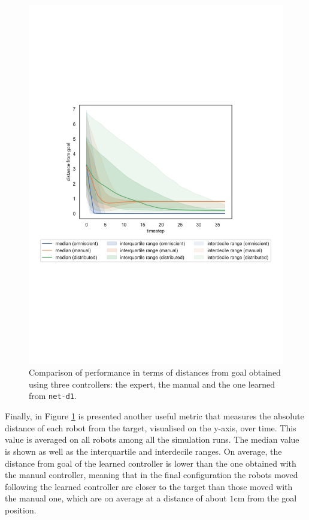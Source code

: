 \begin{figure}[H]
	\centering
	\includegraphics[width=.65\textwidth]{contents/images/net-d1/distances-from-goal-compressed-distributed}%
	\caption[Evaluation of \texttt{net-d1} distances from goal.]{Comparison of 
		performance in terms of distances from goal obtained using three 
		controllers: 
		the expert, the manual and the one learned from \texttt{net-d1}.}
	\label{fig:net-d1distance}
\end{figure}

Finally, in Figure \ref{fig:net-d1distance} is presented another useful metric that 
measures the absolute distance of each robot from the target, visualised on the 
y-axis, over time. This value is averaged on all robots among all the simulation 
runs. The median value is shown as well as the interquartile and interdecile ranges.
On average, the distance from goal of the learned controller is lower than the one 
obtained with the manual controller, meaning that in the final configuration 
the robots moved following the learned controller are closer to the target than 
those moved with the manual one, which are on average at a distance of about 
$1$\gls{cm} from the goal position. 


